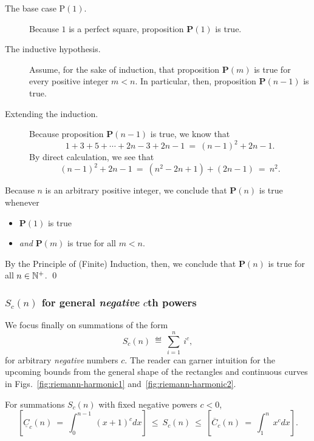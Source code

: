 \begin{description}
\item[{\sf The base case P$(1)$}.]
%
Because $1$ is a perfect square, proposition {\bf P}$(1)$ is true.

\item[{\sf The inductive hypothesis}.]
%
Assume, for the sake of induction, that proposition {\bf P}$(m)$ is
true for every positive integer $m < n$.  In particular, then,
proposition {\bf P}$(n-1)$ is true.

\item[{\sf Extending the induction}.]
%
Because proposition {\bf P}$(n-1)$ is true, we know that
\[ 
 1 + 3 + 5 + \cdots + 2n-3 + 2n-1 \ = \ (n-1)^2 + 2n-1.  \]
By direct calculation, we see that
\[ (n-1)^2 + 2n-1 \ = \ (n^2 -2n +1) + (2n-1) \ = \ n^2. \]
\end{description}
Because $n$ is an arbitrary positive integer, we conclude that
{\bf P}$(n)$ is true whenever
\begin{itemize}
\item
{\bf P}$(1)$ is true
\item
{\em and}
{\bf P}$(m)$ is true for all $m < n$.
\end{itemize}
By the Principle of (Finite) Induction, then, we conclude that {\bf
  P}$(n)$ is true for all $n \in \mathbb{N}^+$.
\qed


\subsubsection{$S_c(n)$ for general {\em negative} $c$th powers}
\label{sec:sum-of-i2c<0}

We focus finally on summations of the form
\[ S_c(n) \ \eqdef \ \sum_{i=1}^n \ i^c, \]
for arbitrary {\em negative} numbers $c$.  The reader can garner
intuition for the upcoming bounds from the general shape of the
rectangles and continuous curves in Figs.~\ref{fig:riemann-harmonic1}
and~\ref{fig:riemann-harmonic2}.

\begin{prop}
\label{thm:general-bounds-negative-xc}
For summations $S_c(n)$ with fixed negative powers $c<0$,
\begin{equation} 
\label{eq:general-bounds-negative-xc}
\left[
\underline{C}_c(n) \ = \
\int_0^{n-1} \ (x+1)^c dx
\right]
\ \leq \ S_c(n) \ \leq \
\left[
\overline{C}_c(n) \ = \
\int_1^n \ x^c dx
\right].
\end{equation}
\end{prop}

